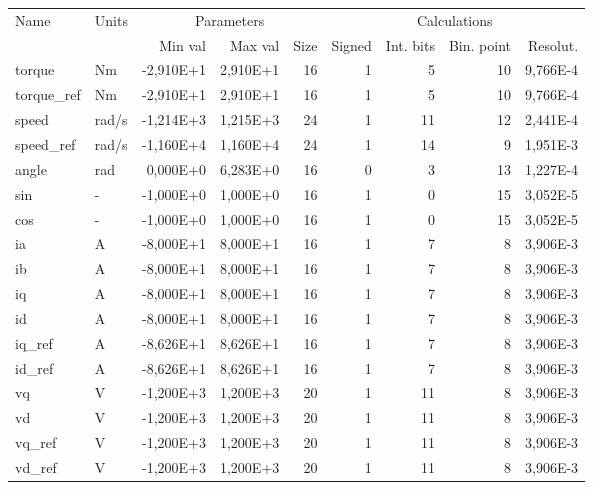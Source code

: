 \label{fixed_point}

\begin{table}[!ht] 
    \centering
    \small
    \begin{tabular}{|l|l|r|r|r|r|r|r|r|}
    \hline
        \multirow{2}{*}{ Name } &  \multirow{2}{*}{ Units } & \multicolumn{3}{|c|}{Parameters} & \multicolumn{4}{|c|}{ Calculations }\\ \cline{3-9}
        ~ & ~ & Min val & Max val & Size & Signed & Int. bits & Bin. point & Resolut. \\ \hhline{|=|=|=|=|=|=|=|=|=|}
        torque & Nm & -2,910E+1 & 2,910E+1 & 16 & 1 & 5 & 10 & 9,766E-4 \\ \hline
        torque\_ref & Nm & -2,910E+1 & 2,910E+1 & 16 & 1 & 5 & 10 & 9,766E-4 \\ \hline
        speed & rad/s & -1,214E+3 & 1,215E+3 & 24 & 1 & 11 & 12 & 2,441E-4 \\ \hline
        speed\_ref & rad/s & -1,160E+4 & 1,160E+4 & 24 & 1 & 14 & 9 & 1,951E-3 \\ \hline
        angle & rad & 0,000E+0 & 6,283E+0 & 16 & 0 & 3 & 13 & 1,227E-4 \\ \hline
        sin & - & -1,000E+0 & 1,000E+0 & 16 & 1 & 0 & 15 & 3,052E-5 \\ \hline
        cos & - & -1,000E+0 & 1,000E+0 & 16 & 1 & 0 & 15 & 3,052E-5 \\ \hline
        ia & A & -8,000E+1 & 8,000E+1 & 16 & 1 & 7 & 8 & 3,906E-3 \\ \hline
        ib & A & -8,000E+1 & 8,000E+1 & 16 & 1 & 7 & 8 & 3,906E-3 \\ \hline
        iq & A & -8,000E+1 & 8,000E+1 & 16 & 1 & 7 & 8 & 3,906E-3 \\ \hline
        id & A & -8,000E+1 & 8,000E+1 & 16 & 1 & 7 & 8 & 3,906E-3 \\ \hline
        iq\_ref & A & -8,626E+1 & 8,626E+1 & 16 & 1 & 7 & 8 & 3,906E-3 \\ \hline
        id\_ref & A & -8,626E+1 & 8,626E+1 & 16 & 1 & 7 & 8 & 3,906E-3 \\ \hline
        vq & V & -1,200E+3 & 1,200E+3 & 20 & 1 & 11 & 8 & 3,906E-3 \\ \hline
        vd & V & -1,200E+3 & 1,200E+3 & 20 & 1 & 11 & 8 & 3,906E-3 \\ \hline
        vq\_ref & V & -1,200E+3 & 1,200E+3 & 20 & 1 & 11 & 8 & 3,906E-3 \\ \hline
        vd\_ref & V & -1,200E+3 & 1,200E+3 & 20 & 1 & 11 & 8 & 3,906E-3 \\ \hline

\end{tabular}
\end{table}
